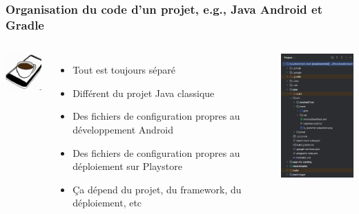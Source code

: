 \documentclass{beamer}
\begin{document}
    \begin{frame}
        \transdissolve
        \frametitle{Organisation du code d'un projet, e.g., Java Android et Gradle}

        \begin{columns}


            \centering
            \includegraphics[width=2cm]{image/android-coffee.png}

            \begin{itemize}

                \item Tout est toujours séparé
                \item Différent du projet Java classique
                \item Des fichiers de configuration propres au développement Android
                \item Des fichiers de configuration propres au déploiement sur Playstore
                \item Ça dépend du projet, du framework, du déploiement, etc

            \end{itemize}


            \centering
            \includegraphics[width=4cm]{image/android-gradle-project-structure.png}

        \end{columns}

    \end{frame}
\end{document}
